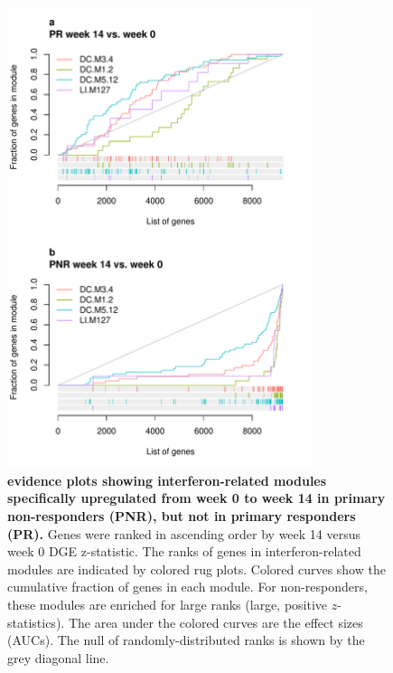 \begin{figure}
    \centering
    \includegraphics[width=0.8\textwidth,page=1]{mainmatter/figures/chapter_04/plot_gene_set_enrichment.evidencePlots_C_3_1_Interferon.pdf}
    \caption[
    ]{
        \textbf{ evidence plots showing interferon-related modules specifically upregulated from week 0 to week 14 in primary non-responders (PNR), but not in primary responders (PR).}
        Genes were ranked in ascending order by week 14 versus week 0 \gls{DGE} z-statistic. 
        The ranks of genes in interferon-related modules are indicated by colored rug plots. 
        Colored curves show the cumulative fraction of genes in each module. 
        For non-responders, these modules are enriched for large ranks (large, positive $z$-statistics). 
        The area under the colored curves are the effect sizes (\glspl{AUC}). 
        The null of randomly-distributed ranks is shown by the grey diagonal line.
    }
    \label{fig:multipants_dge_evidencePlots_C_3_1_Interferon}
\end{figure}

